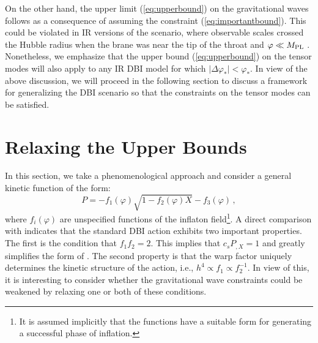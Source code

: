 On the other hand, 
the upper limit (\ref{eq:upperbound}) on the gravitational waves 
follows as a consequence of assuming 
the constraint (\ref{eq:importantbound}). This  
could be violated in IR versions of the scenario, where
observable scales crossed the Hubble radius when the 
brane was near the tip of the throat and $\varphi \ll M_{\mathrm{PL}}$
\cite{brane12,brane14}. 
Nonetheless, we emphasize that the upper bound (\ref{eq:upperbound})
on the tensor modes 
will also apply to any IR DBI model for which 
$|\Delta \varphi_* | < \varphi_*$.  
In view of the above discussion, 
we will proceed in the following section
to discuss a framework for generalizing the DBI scenario so 
that the constraints on the tensor modes can be satisfied. 
% 
% 
% 
% 
\section{Relaxing the Upper Bounds}
% 
\label{sec:relaxing-dbi}
% 
In this section, we take a phenomenological 
approach and consider a general kinetic function of the form:
% 
\begin{equation}
\label{eq:genaction-dbi}
P= -f_1 (\varphi ) \sqrt{1-f_2 (\varphi ) X} -f_3 (\varphi) \,,
\end{equation}
% 
where $f_i (\varphi )$ are unspecified functions of the inflaton 
field\footnote{It is assumed 
implicitly that the functions have a suitable form for 
generating a successful phase of inflation.}.
A direct comparison with  
indicates that the standard DBI action exhibits two important properties. 
The first is the condition that $f_1 f_2 =2$. This implies that 
$c_sP_{,X} =1$ and greatly simplifies the form of . 
The second property is that the warp factor uniquely determines 
the kinetic structure of the action, i.e., $h^4 \propto f_1 \propto f_2^{-1}$.  
In view of this, it is interesting to consider whether
the gravitational wave constraints could be weakened by relaxing one 
or both of these conditions. 


